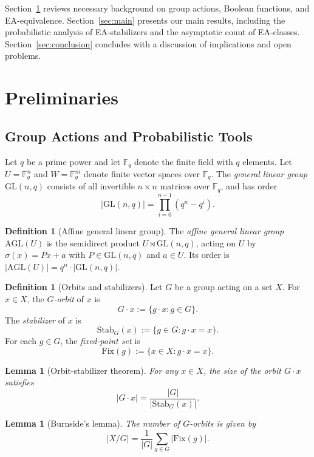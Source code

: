 \documentclass[11pt]{article}
\newtheorem{lemma}[theorem]{Lemma}
\theoremstyle{definition}
\newtheorem{definition}[theorem]{Definition}
\newcommand{\F}{\mathbb{F}}
\newcommand{\GL}{\mathrm{GL}}
\newcommand{\AGL}{\mathrm{AGL}}
\newcommand{\Stab}{\mathrm{Stab}}
\newcommand{\Fix}{\mathrm{Fix}}
\begin{document}
Section~\ref{sec:prelim} reviews necessary
background on group actions, Boolean functions, and EA-equivalence. Section~\ref{sec:main} presents
our main results, including the probabilistic analysis of EA-stabilizers and the asymptotic
count of EA-classes. Section~\ref{sec:conclusion} concludes with a discussion of implications
and open problems.

\section{Preliminaries}\label{sec:prelim}

\subsection{Group Actions and Probabilistic Tools}

Let $q$ be a prime power and let $\F_q$ denote the finite field with $q$ elements.
Let $U=\F_q^n$ and $W=\F_q^m$ denote finite vector spaces over $\F_q$.
The \emph{general linear group} $\GL(n,q)$ consists of all invertible $n\times n$
matrices over $\F_q$, and has order
\[
   |\GL(n,q)| = \prod_{i=0}^{n-1}(q^n-q^i).
\]

\begin{definition}[Affine general linear group]
The \emph{affine general linear group} $\AGL(U)$ is the semidirect product
$U\rtimes\GL(n,q)$, acting on $U$ by $\sigma(x)=Px+a$ with $P\in\GL(n,q)$ and $a\in U$.
Its order is $|\AGL(U)|=q^n\cdot|\GL(n,q)|$.
\end{definition}

\begin{definition}[Orbits and stabilizers]
Let $G$ be a group acting on a set $X$. For $x\in X$, the \emph{$G$-orbit} of $x$ is
\[
   G\cdot x := \{g\cdot x : g\in G\}.
\]
The \emph{stabilizer} of $x$ is
\[
   \Stab_G(x):=\{g\in G: g\cdot x = x\}.
\]
For each $g\in G$, the \emph{fixed-point set} is
\[
   \Fix(g):=\{x\in X: g\cdot x=x\}.
\]
\end{definition}

\begin{lemma}[Orbit-stabilizer theorem]
For any $x\in X$, the size of the orbit $G\cdot x$ satisfies
\[
   |G\cdot x| = \frac{|G|}{|\Stab_G(x)|}.
\]
\end{lemma}

\begin{lemma}[Burnside's lemma]
The number of $G$-orbits is given by
\[
   |X/G| = \frac{1}{|G|}\sum_{g\in G}|\Fix(g)|.
\]
\end{lemma}
\end{document}
